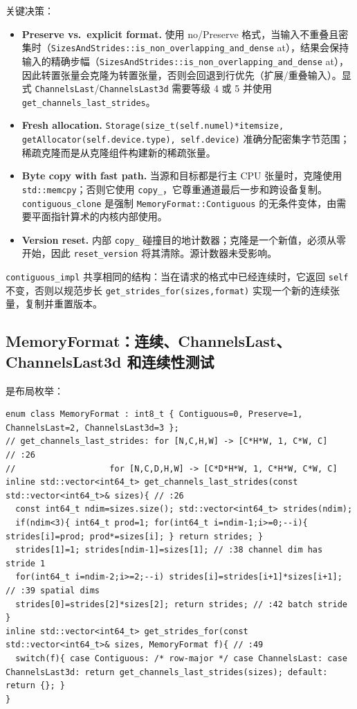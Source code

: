 关键决策：

\begin{itemize}[leftmargin=1.2em]
\item \textbf{Preserve vs.\ explicit format.} 使用 no/Preserve 格式，当输入不重叠且密集时（\texttt{SizesAndStrides::is\_non\_overlapping\_and\_dense} at），结果会保持输入的精确步幅（\texttt{SizesAndStrides::is\_non\_overlapping\_and\_dense} at），因此转置张量会克隆为转置张量，否则会回退到行优先（扩展/重叠输入）。显式 \texttt{ChannelsLast}/\texttt{ChannelsLast3d} 需要等级 4 或 5 并使用 \texttt{get\_channels\_last\_strides}。
\item \textbf{Fresh allocation.} \texttt{Storage(size\_t(self.numel)*itemsize, getAllocator(self.device.type), self.device)} 准确分配密集字节范围；稀疏克隆而是从克隆组件构建新的稀疏张量。
\item \textbf{Byte copy with fast path.} 当源和目标都是行主 CPU 张量时，克隆使用 \texttt{std::memcpy}；否则它使用 \texttt{copy\_}，它尊重通道最后一步和跨设备复制。 \texttt{contiguous\_clone} 是强制 \texttt{MemoryFormat::Contiguous} 的无条件变体，由需要平面指针算术的内核内部使用。
\item \textbf{Version reset.} 内部 \texttt{copy\_} 碰撞目的地计数器；克隆是一个新值，必须从零开始，因此 \texttt{reset\_version} 将其清除。源计数器未受影响。
\end{itemize}

\texttt{contiguous\_impl} 共享相同的结构：当在请求的格式中已经连续时，它返回 \texttt{self} 不变，否则以规范步长 \texttt{get\_strides\_for(sizes,format)} 实现一个新的连续张量，复制并重置版本。

\subsection{MemoryFormat：连续、ChannelsLast、ChannelsLast3d 和连续性测试}
\label{sec:memoryformat}

是布局枚举：

\begin{lstlisting}[caption={four tags, one sentinel.}, label=lst:memformat]
enum class MemoryFormat : int8_t { Contiguous=0, Preserve=1, ChannelsLast=2, ChannelsLast3d=3 };
// get_channels_last_strides: for [N,C,H,W] -> [C*H*W, 1, C*W, C]    // :26
//                   for [N,C,D,H,W] -> [C*D*H*W, 1, C*H*W, C*W, C]
inline std::vector<int64_t> get_channels_last_strides(const std::vector<int64_t>& sizes){ // :26
  const int64_t ndim=sizes.size(); std::vector<int64_t> strides(ndim);
  if(ndim<3){ int64_t prod=1; for(int64_t i=ndim-1;i>=0;--i){ strides[i]=prod; prod*=sizes[i]; } return strides; }
  strides[1]=1; strides[ndim-1]=sizes[1]; // :38 channel dim has stride 1
  for(int64_t i=ndim-2;i>=2;--i) strides[i]=strides[i+1]*sizes[i+1]; // :39 spatial dims
  strides[0]=strides[2]*sizes[2]; return strides; // :42 batch stride
}
inline std::vector<int64_t> get_strides_for(const std::vector<int64_t>& sizes, MemoryFormat f){ // :49
  switch(f){ case Contiguous: /* row-major */ case ChannelsLast: case ChannelsLast3d: return get_channels_last_strides(sizes); default: return {}; }
}
\end{lstlisting}


